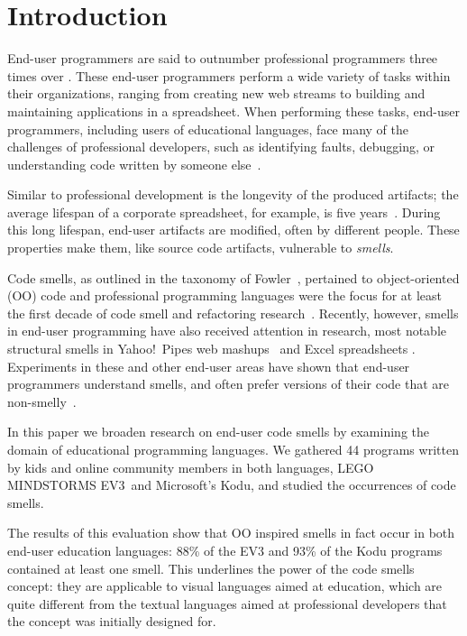 \documentclass[conference]{IEEEtran}
\newcommand{\ms}{LEGO MINDSTORMS EV3}
\newcommand{\todo}[1]{\textbf{#1}}
\begin{document}
\section{Introduction}
End-user programmers are said to outnumber  professional programmers three times over \cite{Scaf2005}.
These end-user programmers perform a wide variety of tasks within their organizations, ranging from creating new web streams to building and maintaining applications in a spreadsheet. When performing these tasks, end-user programmers, including users of educational languages,  face many of the challenges of professional developers, such as identifying faults, debugging, or understanding code written by someone else~\cite{Ko2011}. 

Similar to professional development is the longevity of the produced artifacts; the average lifespan of a corporate spreadsheet, for example, is five years~\cite{Hermans2011}. During this long lifespan, end-user artifacts are modified, often by different people.
These properties make them, like source code artifacts, vulnerable to \emph{smells}. 

Code smells, as outlined in the taxonomy of Fowler~\cite{Fowl1999}, pertained to object-oriented (OO) code and professional programming languages were the focus for at least the first decade of code smell  and refactoring research~\cite{Mens:2004:SSR:972215.972286}. Recently, however, smells in end-user programming have also received attention in research, most notable structural smells in Yahoo!\ Pipes web mashups~\cite{Stolee2011} and Excel spreadsheets \cite{Hermans2012inter}. Experiments in these and other end-user areas have shown that end-user programmers understand smells, and often prefer versions of their code that are non-smelly~\cite{Hermans2012intra, StoleeTSE2013, chambers2013smell}.


In this paper we broaden research on end-user code smells by examining the domain of educational programming languages. We gathered 44 programs written by kids and online community members in both languages, \ms~and Microsoft's Kodu, and studied the occurrences of code smells.

The results of this evaluation show that OO inspired smells in fact occur in both end-user education languages: 88\% of the EV3 and 93\% of the Kodu programs contained at least one smell. This underlines the power of the code smells concept: they are applicable to visual languages aimed at education, which are quite different from the textual languages aimed at professional developers that the concept was initially designed for. 
\end{document}
